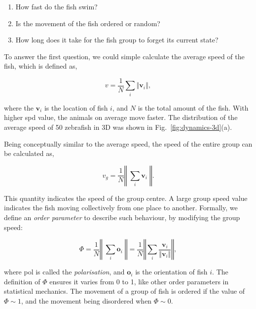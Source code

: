 \documentclass[11pt,twoside]{report}
\begin{document}
\begin{enumerate}
	\item How fast do the fish swim?
	\item Is the movement of the fish ordered or random?
	\item How long does it take for the fish group to forget its current state?
\end{enumerate}

To answer the first question, we could simple calculate the average speed of the fish, which is defined as,

\begin{equation}
	v = \frac1N \sum_i{\left\Vert \mathbf{v}_i \right\Vert},
\label{eq:speed}
\end{equation}

\noindent where the $\mathbf{v}_i$ is the location of fish $i$, and $N$ is the total amount of the fish. With higher \gls{spd} value, the animals on average move faster.
The distribution of the average speed of 50 zebrafish in 3D was shown in Fig.~\ref{fig:dynamics-3d}(a).

Being conceptually similar to the average speed, the speed of the entire group can be calculated as,

$$
v_g = \frac1N \left\Vert
\; \sum_i{\mathbf{v}_i} \;
\right\Vert.
$$

\noindent This quantity indicates the speed of the group centre. A large group speed value indicates the fish  moving collectively from one place to another. Formally, we define an \emph{order parameter} to describe such behaviour, by modifying the group speed:

\begin{equation}
	\Phi = \frac1N \left\Vert
		\; \sum_i \mathbf{o}_i \;
	\right\Vert
	= \frac1N \left\Vert
		\sum_i \frac{\mathbf{v}_i}{\Vert \mathbf{v}_i \Vert}
	\right\Vert,
\label{eq:polarisation}
\end{equation}

\noindent where \gls{pol} is called the \emph{polarisation}, and $\mathbf{o}_i$ is the orientation of fish $i$. The definition of $\Phi$ ensures it varies from 0 to 1, like other order parameters in statistical mechanics.
The movement of a group of fish is ordered if the value of $\Phi \sim 1$, and the movement being disordered when $\Phi \sim 0$.
\end{document}
